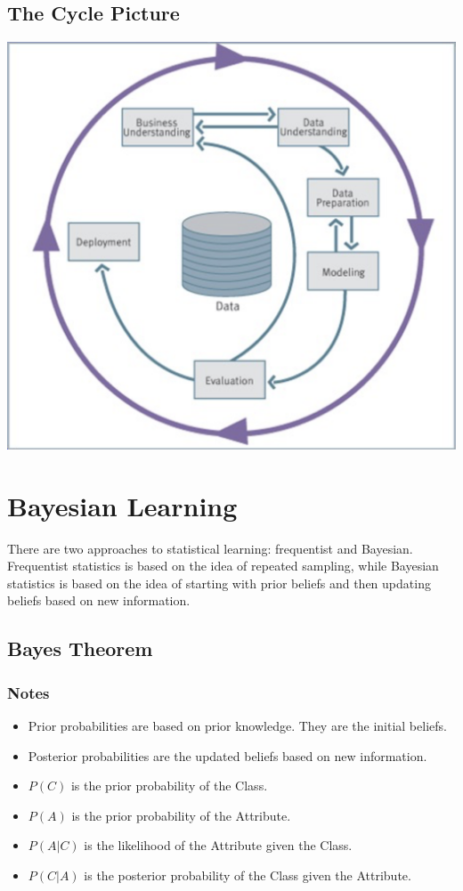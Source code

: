 \documentclass[10pt]{report}
\begin{document}
\section{The Cycle Picture}
\includegraphics[width=\textwidth]{images/cycle.png}

\chapter{Bayesian Learning}
There are two approaches to statistical learning: frequentist and Bayesian. Frequentist statistics is based on the idea of repeated sampling, while Bayesian statistics is based on the idea of starting with prior beliefs and then updating beliefs based on new information.
\section{Bayes Theorem}
\subsection{Notes}
\begin{itemize}
  \item Prior probabilities are based on prior knowledge. They are the initial beliefs.
    \item Posterior probabilities are the updated beliefs based on new information.
  \item $P(C)$ is the prior probability of the Class.
  \item $P(A)$ is the prior probability of the Attribute.
  \item $P(A|C)$ is the likelihood of the Attribute given the Class.
  \item $P(C|A)$ is the posterior probability of the Class given the Attribute.
\end{itemize}
\end{document}
